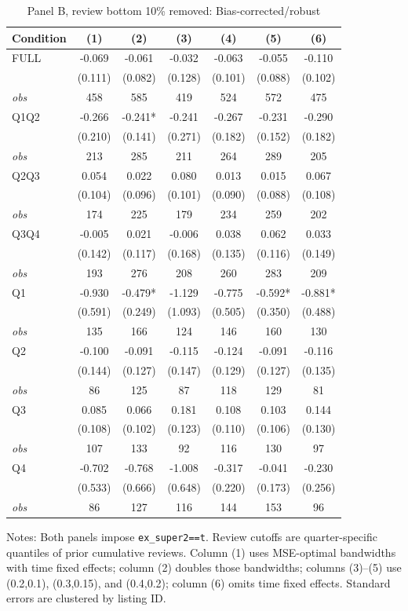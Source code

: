 \begin{table}[!htbp]
\centering
\caption{Panel B, review bottom 10\% removed: Bias-corrected/robust}
\begin{tabular}{lcccccc}
\toprule
Condition & (1) & (2) & (3) & (4) & (5) & (6) \\
\midrule
FULL & -0.069 & -0.061 & -0.032 & -0.063 & -0.055 & -0.110 \\
 & (0.111) & (0.082) & (0.128) & (0.101) & (0.088) & (0.102) \\
\textit{obs} & 458 & 585 & 419 & 524 & 572 & 475 \\
Q1Q2 & -0.266 & -0.241* & -0.241 & -0.267 & -0.231 & -0.290 \\
 & (0.210) & (0.141) & (0.271) & (0.182) & (0.152) & (0.182) \\
\textit{obs} & 213 & 285 & 211 & 264 & 289 & 205 \\
Q2Q3 & 0.054 & 0.022 & 0.080 & 0.013 & 0.015 & 0.067 \\
 & (0.104) & (0.096) & (0.101) & (0.090) & (0.088) & (0.108) \\
\textit{obs} & 174 & 225 & 179 & 234 & 259 & 202 \\
Q3Q4 & -0.005 & 0.021 & -0.006 & 0.038 & 0.062 & 0.033 \\
 & (0.142) & (0.117) & (0.168) & (0.135) & (0.116) & (0.149) \\
\textit{obs} & 193 & 276 & 208 & 260 & 283 & 209 \\
Q1 & -0.930 & -0.479* & -1.129 & -0.775 & -0.592* & -0.881* \\
 & (0.591) & (0.249) & (1.093) & (0.505) & (0.350) & (0.488) \\
\textit{obs} & 135 & 166 & 124 & 146 & 160 & 130 \\
Q2 & -0.100 & -0.091 & -0.115 & -0.124 & -0.091 & -0.116 \\
 & (0.144) & (0.127) & (0.147) & (0.129) & (0.127) & (0.135) \\
\textit{obs} & 86 & 125 & 87 & 118 & 129 & 81 \\
Q3 & 0.085 & 0.066 & 0.181 & 0.108 & 0.103 & 0.144 \\
 & (0.108) & (0.102) & (0.123) & (0.110) & (0.106) & (0.130) \\
\textit{obs} & 107 & 133 & 92 & 116 & 130 & 97 \\
Q4 & -0.702 & -0.768 & -1.008 & -0.317 & -0.041 & -0.230 \\
 & (0.533) & (0.666) & (0.648) & (0.220) & (0.173) & (0.256) \\
\textit{obs} & 86 & 127 & 116 & 144 & 153 & 96 \\
\bottomrule
\end{tabular}
\begin{minipage}{0.98\textwidth}\footnotesize
Notes: Both panels impose \texttt{ex\_super2==t}. Review cutoffs are quarter-specific quantiles of prior cumulative reviews. Column (1) uses MSE-optimal bandwidths with time fixed effects; column (2) doubles those bandwidths; columns (3)--(5) use (0.2,0.1), (0.3,0.15), and (0.4,0.2); column (6) omits time fixed effects. Standard errors are clustered by listing ID.
\end{minipage}
\end{table}

